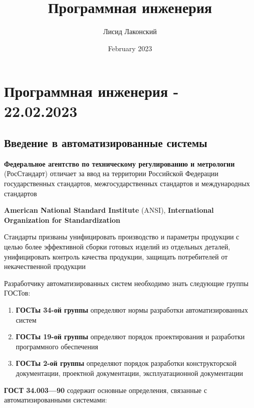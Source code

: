 \documentclass{article}
\title{Программная инженерия}
\author{Лисид Лаконский}
\date{February 2023}
\begin{document}
\raggedright

\maketitle
\tableofcontents
\pagebreak

\section{Программная инженерия - 22.02.2023}

\subsection{Введение в автоматизированные системы}

\textbf{Федеральное агентство по техническому регулированию и метрологии} (РосСтандарт) отличает за ввод на территории Российской Федерации государственных стандартов, межгосударственных стандартов и международных стандартов

\textbf{American National Standard Institute} (ANSI), \textbf{International Organization for Standardization}

\hfill

Стандарты призваны унифицировать производство и параметры продукции с целью более эффективной сборки готовых изделий из отдельных деталей, унифицировать контроль качества продукции, защищать потребителей от некачественной продукции

\hfill

Разработчику автоматизированных систем необходимо знать следующие группы ГОСТов:

\begin{enumerate}
	\item \textbf{ГОСТы 34-ой группы} определяют нормы разработки автоматизированных систем
	\item \textbf{ГОСТы 19-ой группы} определяют порядок проектирования и разработки программного обеспечения
	\item \textbf{ГОСТы 2-ой группы} определяют порядок разработки конструкторской документации, проектной документации, эксплуатационной документации
\end{enumerate}

\textbf{ГОСТ 34.003—90} содержит основные определения, связанные с автоматизированными системами:
\end{document}
